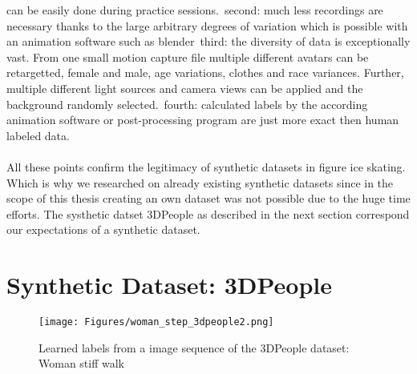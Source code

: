 can be easily done during practice sessions.\
second: much less recordings are necessary thanks to the large arbitrary degrees of variation which is possible with
an animation software such as blender\
third: the diversity of data is exceptionally vast.
From one small motion capture file multiple different avatars can be retargetted, female and male, age variations,
clothes and race variances.
Further, multiple different light sources and camera views can be applied and the background randomly selected.\
fourth: calculated labels by the according animation software or post-processing program are just more exact then
human labeled data.
\\\mbox{}\\
All these points confirm the legitimacy of synthetic datasets in figure ice skating.
Which is why we researched on already existing synthetic datasets since in the scope of this thesis creating an own
dataset was not possible due to the huge time efforts.
The systhetic datset 3DPeople as described in the next section correspond our expectations of a synthetic dataset.




\section{Synthetic Dataset: 3DPeople}

\begin{figure}
    \centering
    \texttt{[image: Figures/woman\_step\_3dpeople2.png]}
    \decoRule
    \caption[3DPeople]{Learned labels from a image sequence of the 3DPeople dataset: Woman stiff walk}
    \label{fig:woman_step_3dpeople}
\end{figure}


